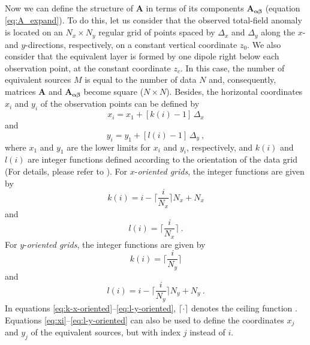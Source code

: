 Now we can define the structure of $\mathbf{A}$ in terms of its components 
$\mathbf{A_{\boldsymbol{\alpha\beta}}}$ (equation \ref{eq:A_expand}). To do this, 
let us consider that the observed total-field anomaly is located on an $N_{x} \times N_{y}$ 
regular grid of points spaced by $\Delta_{x}$ and $\Delta_{y}$ along the $x$- and $y$-directions,
respectively, on a constant vertical coordinate $z_{0}$. We also consider that the equivalent layer
is formed by one dipole right below each observation point, at the constant coordinate $z_{c}$.
In this case, the number of equivalent sources $M$ is equal to the number of data $N$ and, 
consequently, matrices $\mathbf{A}$ and $\mathbf{A_{\boldsymbol{\alpha\beta}}}$ become 
square ($N \times N$). 
Besides, the horizontal coordinates $x_{i}$ and $y_{i}$ of the observation points 
can be defined by
\begin{equation}
x_{i} = x_{1} + \left[ k(i) - 1 \right] \, \Delta_{x}
\label{eq:xi}
\end{equation}
and
\begin{equation}
y_{i} = y_{1} + \left[ l(i) - 1 \right] \, \Delta_{y} \: ,
\label{eq:yi}
\end{equation}
where $x_{1}$ and $y_{1}$ are the lower limits for $x_{i}$ and $y_{i}$, respectively,
and $k(i)$ and $l(i)$ are integer functions defined according to the orientation
of the data grid (For details, please refer to \citet{takahashi2020convolutional}). 
For $x$-\textit{oriented grids}, the integer functions are given by
\begin{equation}
k(i)  = i - \Bigg\lceil \frac{i}{N_{x}} \Bigg\rceil N_{x} + N_{x}
\label{eq:k-x-oriented}
\end{equation}
and
\begin{equation}
l(i) = \Bigg\lceil \frac{i}{N_{x}} \Bigg\rceil \: .
\label{eq:l-x-oriented}
\end{equation}
For $y$-\textit{oriented grids}, the integer functions are given by
\begin{equation}
k(i) = \Bigg\lceil \frac{i}{N_{y}} \Bigg\rceil
\label{eq:k-y-oriented}
\end{equation}
and
\begin{equation}
l(i) = i - \Bigg\lceil \frac{i}{N_{y}} \Bigg\rceil N_{y} + N_{y} \: .
\label{eq:l-y-oriented}
\end{equation}
In equations \ref{eq:k-x-oriented}--\ref{eq:l-y-oriented}, $\lceil \cdot \rceil$ denotes the ceiling 
function \citep[e.g.,][ p. 67-68]{graham-etal1994}.
Equations \ref{eq:xi}--\ref{eq:l-y-oriented} can also be used to define the coordinates 
$x_{j}$ and $y_{j}$ of the equivalent sources, but with index $j$ instead of $i$.


